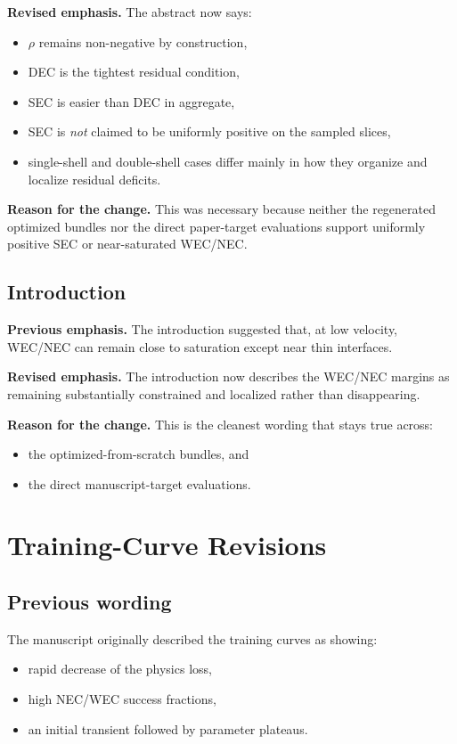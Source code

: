 \documentclass[11pt]{article}
\begin{document}
\textbf{Revised emphasis.}
The abstract now says:
\begin{itemize}[leftmargin=*]
\item $\rho$ remains non-negative by construction,
\item DEC is the tightest residual condition,
\item SEC is easier than DEC in aggregate,
\item SEC is \emph{not} claimed to be uniformly positive on the sampled slices,
\item single-shell and double-shell cases differ mainly in how they organize and localize residual deficits.
\end{itemize}

\textbf{Reason for the change.}
This was necessary because neither the regenerated optimized bundles nor the direct paper-target
evaluations support uniformly positive SEC or near-saturated WEC/NEC.

\subsection*{Introduction}
\textbf{Previous emphasis.}
The introduction suggested that, at low velocity, WEC/NEC can remain close to saturation except near
thin interfaces.

\textbf{Revised emphasis.}
The introduction now describes the WEC/NEC margins as remaining substantially constrained and
localized rather than disappearing.

\textbf{Reason for the change.}
This is the cleanest wording that stays true across:
\begin{itemize}[leftmargin=*]
\item the optimized-from-scratch bundles, and
\item the direct manuscript-target evaluations.
\end{itemize}

\section*{Training-Curve Revisions}
\subsection*{Previous wording}
The manuscript originally described the training curves as showing:
\begin{itemize}[leftmargin=*]
\item rapid decrease of the physics loss,
\item high NEC/WEC success fractions,
\item an initial transient followed by parameter plateaus.
\end{itemize}
\end{document}
